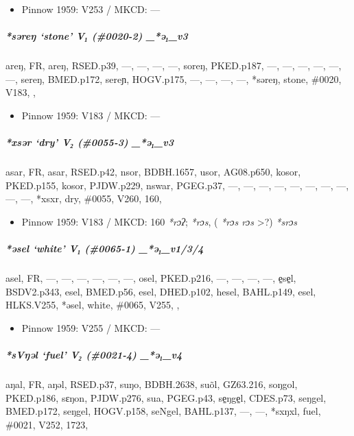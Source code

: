 \documentclass[a4paper,]{article}
\providecommand{\tightlist}{%
  \setlength{\itemsep}{0pt}\setlength{\parskip}{0pt}}
\let\oldsubparagraph\subparagraph
\renewcommand{\subparagraph}[1]{\oldsubparagraph{#1}\mbox{}}
\begin{document}
\begin{itemize}
\tightlist
\item
  Pinnow 1959: V253 / MKCD: ---
\end{itemize}

\subparagraph{\texorpdfstring{\emph{*səreŋ} `stone' V₁ (\#0020-2)
\_*ə₁\_v3}{*səreŋ stone V₁ (\#0020-2) \_*ə₁\_v3}}\label{sux259reux14b-stone-v-0020-2-_ux259_v3}

areŋ, FR, areŋ, RSED.p39, ---, ---, ---, ---, soreŋ, PKED.p187, ---,
---, ---, ---, ---, ---, sereŋ, BMED.p172, sereɲ, HOGV.p175, ---, ---,
---, ---, *səreŋ, stone, \#0020, V183, ,

\begin{itemize}
\tightlist
\item
  Pinnow 1959: V183 / MKCD: ---
\end{itemize}

\subparagraph{\texorpdfstring{\emph{*xsər} `dry' V₂ (\#0055-3)
\_*ə₁\_v3}{*xsər dry V₂ (\#0055-3) \_*ə₁\_v3}}\label{xsux259r-dry-v-0055-3-_ux259_v3}

asar, FR, asar, RSED.p42, nsor, BDBH.1657, usor, AG08.p650, kosor,
PKED.p155, kosor, PJDW.p229, nswar, PGEG.p37, ---, ---, ---, ---, ---,
---, ---, ---, ---, ---, *xsxr, dry, \#0055, V260, 160,

\begin{itemize}
\tightlist
\item
  Pinnow 1959: V183 / MKCD: 160 \emph{*rɔʔ}; \emph{*rɔs}, ( \emph{*rɔs
  rɔs} \textgreater{}?) \emph{*srɔs}
\end{itemize}

\subparagraph{\texorpdfstring{\emph{*əsel} `white' V₁ (\#0065-1)
\_*ə₁\_v1/3/4}{*əsel white V₁ (\#0065-1) \_*ə₁\_v1/3/4}}\label{ux259sel-white-v-0065-1-_ux259_v134}

asel, FR, ---, ---, ---, ---, ---, ---, osel, PKED.p216, ---, ---, ---,
---, e̠se̠l, BSDV2.p343, esel, BMED.p56, esel, DHED.p102, hesel,
BAHL.p149, esel, HLKS.V255, *əsel, white, \#0065, V255, ,

\begin{itemize}
\tightlist
\item
  Pinnow 1959: V255 / MKCD: ---
\end{itemize}

\subparagraph{\texorpdfstring{\emph{*sVŋəl} `fuel' V₂ (\#0021-4)
\_*ə₁\_v4}{*sVŋəl fuel V₂ (\#0021-4) \_*ə₁\_v4}}\label{svux14bux259l-fuel-v-0021-4-_ux259_v4}

aŋal, FR, aŋəl, RSED.p37, suŋo, BDBH.2638, suõl, GZ63.216, soŋgol,
PKED.p186, sɛŋon, PJDW.p276, sua, PGEG.p43, se̠ŋge̠l, CDES.p73, seŋgel,
BMED.p172, seŋgel, HOGV.p158, seNgel, BAHL.p137, ---, ---, *sxŋxl, fuel,
\#0021, V252, 1723,
\end{document}
